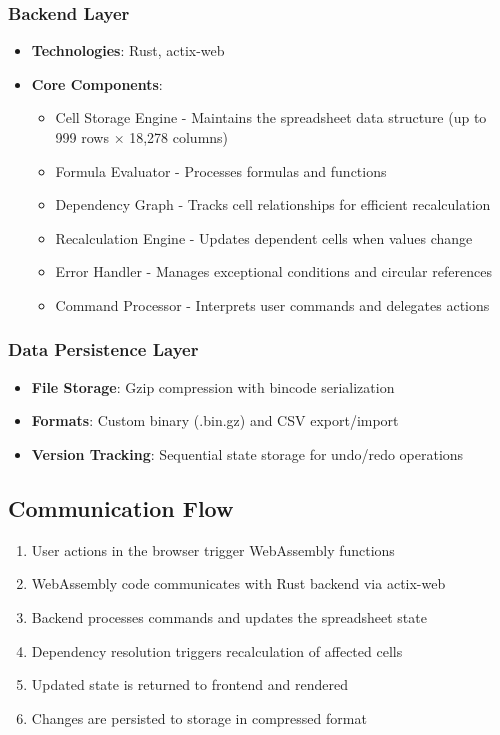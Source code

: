 \documentclass[10pt,a4paper]{article}  %
\begin{document}
\subsubsection{Backend Layer}
\begin{itemize}
    \item \textbf{Technologies}: Rust, actix-web
    \item \textbf{Core Components}:
    \begin{itemize}
        \item Cell Storage Engine - Maintains the spreadsheet data structure (up to 999 rows $\times$ 18,278 columns)
        \item Formula Evaluator - Processes formulas and functions
        \item Dependency Graph - Tracks cell relationships for efficient recalculation
        \item Recalculation Engine - Updates dependent cells when values change
        \item Error Handler - Manages exceptional conditions and circular references
        \item Command Processor - Interprets user commands and delegates actions
    \end{itemize}
\end{itemize}

\subsubsection{Data Persistence Layer}
\begin{itemize}
    \item \textbf{File Storage}: Gzip compression with bincode serialization
    \item \textbf{Formats}: Custom binary (.bin.gz) and CSV export/import
    \item \textbf{Version Tracking}: Sequential state storage for undo/redo operations
\end{itemize}

\subsection{Communication Flow}

\begin{enumerate}
    \item User actions in the browser trigger WebAssembly functions
    \item WebAssembly code communicates with Rust backend via actix-web
    \item Backend processes commands and updates the spreadsheet state
    \item Dependency resolution triggers recalculation of affected cells
    \item Updated state is returned to frontend and rendered
    \item Changes are persisted to storage in compressed format
\end{enumerate}
\end{document}

